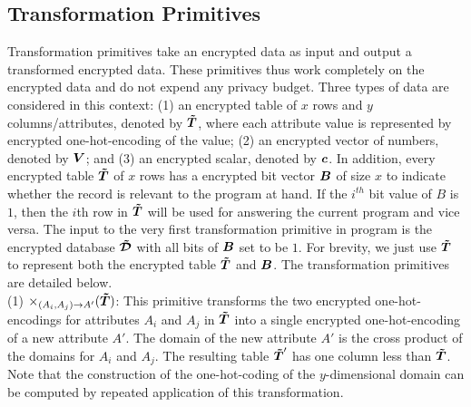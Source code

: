 \subsection{Transformation Primitives}\label{sec:transformation_primitives}
Transformation primitives take an encrypted data as input and output a transformed encrypted data.  These primitives thus work completely on the encrypted data and do not expend any privacy budget. Three types of data are considered in this context: (1) an encrypted table of $x$ rows and $y$ columns/attributes, denoted by $\boldsymbol{\tilde{T}}$, where each attribute value is represented by encrypted one-hot-encoding of the value; (2) an encrypted vector of numbers, denoted by $\boldsymbol{V}$; and (3) an encrypted scalar, denoted by $\boldsymbol{c}$. In addition, every encrypted table $\boldsymbol{\tilde{T}}$ of $x$ rows has a encrypted bit vector $\boldsymbol{B}$ of size $x$ to indicate whether the record is relevant to the program at hand. If the $i^{th}$ bit value of $B$ is $1$, then the $i$th row in $\boldsymbol{\tilde{T}}$ will be used for answering the current program and vice versa. The input to the very first transformation primitive in \system program is the encrypted database $\boldsymbol{\tilde{\mathcal{D}}}$ with all bits of $\boldsymbol{B}$ set to be $1$. For brevity, we just use $\boldsymbol{\tilde{T}}$ to represent both the encrypted table $\boldsymbol{\tilde{T}}$ and $\boldsymbol{B}$. The transformation primitives are detailed below.
\\(1) $\times_{(A_i,A_j)\rightarrow A'}(\boldsymbol{\tilde{T}})$: This primitive transforms the two encrypted one-hot-encodings for attributes $A_i$ and $A_j$ in $\boldsymbol{\tilde{T}}$ into a single encrypted one-hot-encoding of a new attribute $A'$. The domain of the new attribute $A'$ is the cross product of the domains for $A_i$ and $A_j$. The resulting table $\boldsymbol{\tilde{T}}'$ has one column less than $\boldsymbol{\tilde{T}}$. Note that the construction of the one-hot-coding of the $y$-dimensional domain can be computed by repeated application of this transformation. \\	
